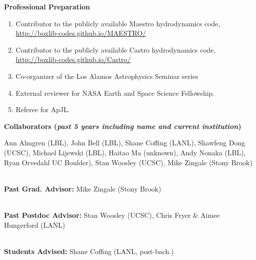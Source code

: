 \documentclass[11pt,letterpaper,english]{article}
\begin{document}
\begin{flushleft} {\bf Professional Preparation}
\begin{enumerate}
\item Contributor to the publicly available Maestro hydrodynamics
  code, \url{http://boxlib-codes.github.io/MAESTRO/}\\

\item Contributor to the publicly available Castro hydrodynamics code,
  \url{http://boxlib-codes.github.io/Castro/} \\

\item Co-organizer of the Los Alamos Astrophysics Seminar series \\

\item External reviewer for NASA Earth and Space Science Fellowship. \\
\item Referee for ApJL. \\
\end{enumerate}

\vspace{-6pt}
{\bf Collaborators ({\emph{past 5 years including name and current institution}})} 


Ann Almgren (LBL),
John Bell (LBL),
Shane Coffing (LANL),
Shawfeng Dong (UCSC),
Michael Lijewski (LBL),
Haitao Ma (unknown),
Andy Nonaka (LBL),
Ryan Orvedahl UC Boulder),
Stan Woosley (UCSC),
Mike Zingale (Stony Brook)

\ \\
{\bf Past Grad. Advisor:}
Mike Zingale (Stony Brook)

\ \\[-4mm]
{\bf Past Postdoc Advisor:}
Stan Woosley (UCSC),  Chris Fryer \& Aimee Hungerford (LANL)

\ \\[-4mm]
{\bf Students Advised:}
Shane Coffing (LANL, post-bach.)


\end{flushleft}
\end{document}
